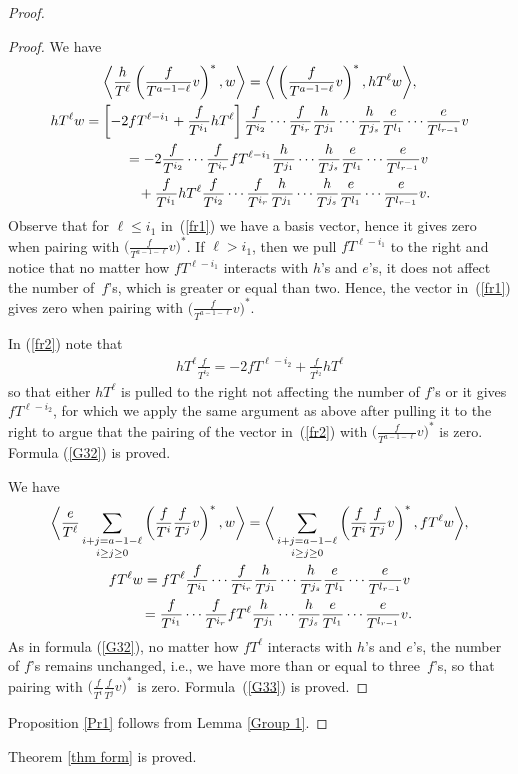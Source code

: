 \begin{proof}
\begin{proof}
We have
\begin{gather}
 \bigg\langle \frac{h}{T^\ell} \left(\frac{f}{T^{a-1-\ell}}v\right)^*, w \bigg\rangle = \bigg\langle \left(\frac{f}{T^{a-1-\ell}}v\right)^*, hT^{\ell} w \bigg\rangle,\nonumber\\
hT^{\ell} w = \left[-2 fT^{\ell-i_1}+ \frac{f}{T^{i_1}} hT^{\ell} \right] \frac{f}{T^{i_2}}\cdots\frac{f}{T^{i_r}} \frac{h}{T^{j_1}}\cdots\frac{h}{T^{j_s}} \frac{e}{T^{l_1}}\cdots\frac{e}{T^{l_{r-1}}} v \nonumber \\
\hphantom{hT^{\ell} w} = -2 \frac{f}{T^{i_2}}\cdots\frac{f}{T^{i_r}} fT^{\ell-i_1} \frac{h}{T^{j_1}}\cdots\frac{h}{T^{j_s}} \frac{e}{T^{l_1}}\cdots\frac{e}{T^{l_{r-1}}} v \label{fr1} \\
\hphantom{hT^{\ell} w=} + \frac{f}{T^{i_1}} hT^{\ell} \frac{f}{T^{i_2}}\cdots\frac{f}{T^{i_r}} \frac{h}{T^{j_1}}\cdots\frac{h}{T^{j_s}} \frac{e}{T^{l_1}}\cdots\frac{e}{T^{l_{r-1}}} v. \label{fr2}
\end{gather}
Observe that for $\ell \leq i_1$ in~(\ref{fr1}) we have a basis vector, hence it gives zero when pairing with $\big(\frac{f}{T^{a-1-\ell}}v\big)^*$. If $\ell > i_1$, then we pull $fT^{\ell-i_1}$ to the right and notice that no matter how $fT^{\ell-i_1}$ interacts with $h$'s and $e$'s, it does not affect the number of~$f$'s, which is greater or equal than two. Hence, the vector in~(\ref{fr1}) gives zero when pairing with $\big(\frac{f}{T^{a-1-\ell}}v\big)^*$.

In (\ref{fr2}) note that
\begin{gather*}
hT^{\ell} \frac{f}{T^{i_2}} = -2 fT^{\ell-i_2} + \frac{f}{T^{i_2}} hT^{\ell}
\end{gather*}
so that either $hT^{\ell}$ is pulled to the right not affecting the number of $f$'s or it gives $fT^{\ell-i_2}$, for which we apply the same argument as above after pulling it to the right to argue that the pairing of the vector in~(\ref{fr2}) with $\big(\frac{f}{T^{a-1-\ell}}v\big)^*$ is zero. Formula (\ref{G32}) is proved.

We have
\begin{gather*}
\bigg\langle \frac{e}{T^{\ell}} \mathop{\sum_{i+j=a-1-\ell}}_{i\geq j\geq 0} \left(\frac{f}{T^i}\frac{f}{T^j}v\right)^*, w \bigg\rangle = \bigg\langle \mathop{\sum_{i+j=a-1-\ell}}_{i\geq j\geq 0} \left(\frac{f}{T^i}\frac{f}{T^j}v\right)^*, fT^{\ell} w \bigg\rangle, \\
fT^{\ell} w = fT^{\ell} \frac{f}{T^{i_1}}\cdots\frac{f}{T^{i_r}}
\frac{h}{T^{j_1}}\cdots\frac{h}{T^{j_s}} \frac{e}{T^{l_1}}\cdots\frac{e}{T^{l_{r-1}}} v \\
\hphantom{fT^{\ell} w} = \frac{f}{T^{i_1}}\cdots\frac{f}{T^{i_r}} fT^{\ell}
\frac{h}{T^{j_1}}\cdots\frac{h}{T^{j_s}} \frac{e}{T^{l_1}}\cdots\frac{e}{T^{l_{r-1}}} v.
\end{gather*}
As in formula (\ref{G32}), no matter how $fT^{\ell}$ interacts with $h$'s and $e$'s, the number of $f$'s remains unchanged, i.e., we have more than or equal to three~$f$'s, so that pairing with $\big(\frac{f}{T^i}\frac{f}{T^j}v\big)^*$ is zero. Formula~(\ref{G33}) is proved.
\end{proof}

Proposition \ref{Pr1} follows from Lemma \ref{Group 1}.
\end{proof}

Theorem \ref{thm form} is proved.
